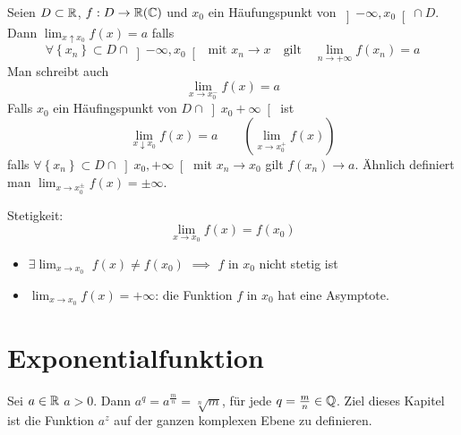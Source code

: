 \begin{Def}
  Seien $D\subset\mathbb{R}$, $f:D\to\mathbb{R}(\mathbb{C})$ und $x_0$ ein Häufungspunkt 
von $\left] -\infty,x_0 \right[\cap D$. Dann $\lim_{x\uparrow x_0}f(x)=a$ falls 
\[\forall \left\{ x_n \right\}\subset D\cap \left] -\infty, x_0 \right[ 
\;\;\mbox{mit } x_n\to x \quad\mbox{gilt}\quad 
\lim_{n\to+\infty}f(x_n)=a\] 
Man schreibt auch
\[
\lim_{x\to x_0^-} f(x)=a
\]
Falls $x_0$ ein Häufingspunkt von $D\cap \left] x_0+\infty \right[$ ist
  \[\lim_{x\downarrow x_0}f(x)=a \qquad \left(\lim_{x\to x_0^+} f(x)\right)\]
  falls $\forall \left\{ x_n \right\}\subset D\cap \left] x_0, +\infty \right[$ 
mit $x_n\to x_0$ gilt $f(x_n)\to a$. Ähnlich definiert
man $\lim_{x\to x_0^\pm}f(x)=\pm\infty$.
\end{Def}
\begin{Bsp}
  Stetigkeit:
  \[\lim_{x\to x_0}f(x)=f(x_0)\]
  \begin{itemize}
    \item $\exists \lim_{x\to x_0}$ $f(x)\neq f(x_0)$ $\implies$ 
$f$ in $x_0$ nicht stetig ist
\item $\lim_{x\to x_0}f(x)=+\infty$: die Funktion $f$ in $x_0$ hat eine Asymptote.
  \end{itemize}
\end{Bsp}
\section{Exponentialfunktion}
Sei $a\in\mathbb{R}$ $a>0$. Dann $a^q=a^\frac{m}{n}=\sqrt[n]{m}$, f\"ur jede
$q=\frac{m}{n}\in\mathbb{Q}$. Ziel dieses Kapitel ist die Funktion $a^z$
auf der ganzen komplexen Ebene zu definieren.


